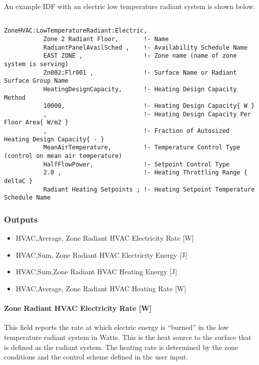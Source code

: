 An example IDF with an electric low temperature radiant system is shown below.

\begin{lstlisting}

ZoneHVAC:LowTemperatureRadiant:Electric,
           Zone 2 Radiant Floor,       !- Name
           RadiantPanelAvailSched ,    !- Availability Schedule Name
           EAST ZONE ,                 !- Zone name (name of zone system is serving)
           Zn002:Flr001 ,              !- Surface Name or Radiant Surface Group Name
           HeatingDesignCapacity,      !- Heating Design Capacity Method
           10000,                      !- Heating Design Capacity{ W }
           ,                           !- Heating Design Capacity Per Floor Area{ W/m2 }
           ,                           !- Fraction of Autosized Heating Design Capacity{ - }
           MeanAirTemperature,         !- Temperature Control Type (control on mean air temperature)
           HalfFlowPower,              !- Setpoint Control Type
           2.0 ,                       !- Heating Throttling Range { deltaC }
           Radiant Heating Setpoints ; !- Heating Setpoint Temperature Schedule Name
\end{lstlisting}

\subsubsection{Outputs}\label{outputs-7-007}

\begin{itemize}
\item
  HVAC,Average, Zone Radiant HVAC Electricity Rate {[}W{]}
\item
  HVAC,Sum, Zone Radiant HVAC Electricity Energy {[}J{]}
\item
  HVAC,Sum,Zone Radiant HVAC Heating Energy {[}J{]}
\item
  HVAC,Average, Zone Radiant HVAC Heating Rate {[}W{]}
\end{itemize}

\paragraph{Zone Radiant HVAC Electricity Rate {[}W{]}}\label{zone-radiant-hvac-electric-power-w}

This field reports the rate at which electric energy is ``burned'' in the low temperature radiant system in Watts. This is the heat source to the surface that is defined as the radiant system. The heating rate is determined by the zone conditions and the control scheme defined in the user input.

